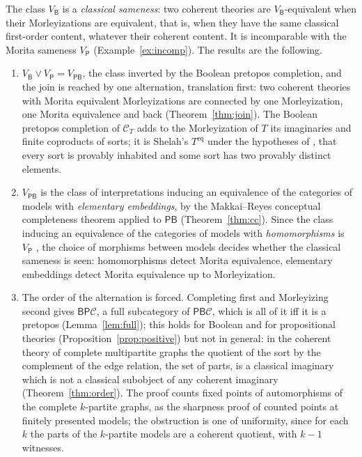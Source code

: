 \documentclass[11pt]{amsart}
\theoremstyle{definition}
\newcommand{\PP}{\mathsf P}
\newcommand{\BB}{\mathsf B}
\newcommand{\cC}{\mathcal C}
\begin{document}
The class $V_\BB$ is a \emph{classical sameness}: two coherent theories
are $V_\BB$-equivalent when their Morleyizations are equivalent, that
is, when they have the same classical first-order content, whatever
their coherent content. It is incomparable with the Morita sameness
$V_\PP$ (Example~\ref{ex:incomp}). The results are the following.
\begin{enumerate}
\item[(A)] $V_\BB\vee V_\PP=V_{\PP\BB}$, the class inverted by the
Boolean pretopos completion, and the join is reached by one
alternation, translation first: two coherent theories with Morita
equivalent Morleyizations are connected by one Morleyization, one
Morita equivalence and back (Theorem~\ref{thm:join}). The Boolean
pretopos completion of $\cC_T$ adds to the Morleyization of $T$ its
imaginaries and finite coproducts of sorts; it is Shelah's
$T^{\mathrm{eq}}$ under the hypotheses of \cite{Harnik11}, that every sort is provably
inhabited and some sort has two provably distinct elements.
\item[(B)] $V_{\PP\BB}$ is the class of interpretations inducing an
equivalence of the categories of models with \emph{elementary
embeddings}, by the Makkai--Reyes conceptual completeness theorem
\cite[7.1.8]{MR77} applied to $\PP\BB$ (Theorem~\ref{thm:cc}). Since the
class inducing an equivalence of the categories of models with
\emph{homomorphisms} is $V_\PP$ \cite[Thm.~6.1]{TheoryComp}, the choice
of morphisms between models decides whether the classical sameness is
seen: homomorphisms detect Morita equivalence, elementary embeddings
detect Morita equivalence up to Morleyization.
\item[(C)] The order of the alternation is forced. Completing first and
Morleyizing second gives $\BB\PP\cC$, a full subcategory of
$\PP\BB\cC$, which is all of it iff it is a pretopos
(Lemma~\ref{lem:full}); this holds for Boolean and for propositional
theories (Proposition~\ref{prop:positive}) but not in general: in the
coherent theory of complete multipartite graphs the quotient of the
sort by the complement of the edge relation, the set of parts, is a
classical imaginary which is not a classical subobject of any coherent
imaginary (Theorem~\ref{thm:order}). The proof counts fixed points of
automorphisms of the complete $k$-partite graphs, as the sharpness proof
of \cite[Thm.~5.6]{TheoryComp} counted points at finitely presented
models; the obstruction is one of uniformity, since for each $k$ the parts of
the $k$-partite models are a coherent quotient, with $k-1$ witnesses.

\end{enumerate}
\end{document}
